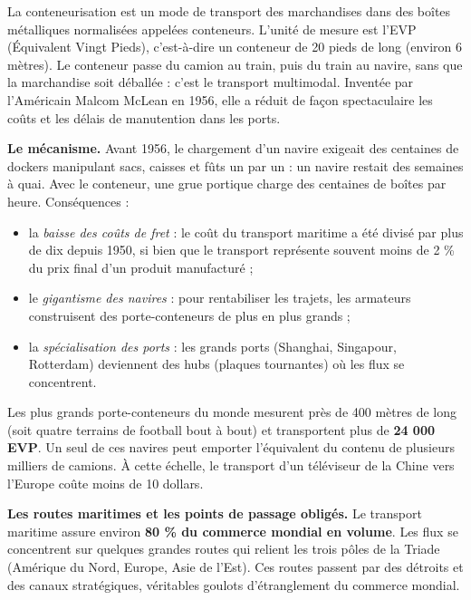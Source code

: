 \documentclass[11pt]{article}
\newcommand{\cle}[1]{{\popxbold\color{popdark}#1}}
\begin{document}
\begin{definition}[La conteneurisation]
La \cle{conteneurisation} est un mode de transport des marchandises dans des boîtes métalliques normalisées appelées \cle{conteneurs}. L'unité de mesure est l'\cle{EVP} (Équivalent Vingt Pieds), c'est-à-dire un conteneur de 20 pieds de long (environ 6 mètres). Le conteneur passe du camion au train, puis du train au navire, sans que la marchandise soit déballée : c'est le \cle{transport multimodal}. Inventée par l'Américain Malcom McLean en 1956, elle a réduit de façon spectaculaire les coûts et les délais de manutention dans les ports.
\end{definition}

\textbf{Le mécanisme.} Avant 1956, le chargement d'un navire exigeait des centaines de dockers manipulant sacs, caisses et fûts un par un : un navire restait des semaines à quai. Avec le conteneur, une grue portique charge des centaines de boîtes par heure. Conséquences :

\begin{itemize}
\item la \emph{baisse des coûts de fret} : le coût du transport maritime a été divisé par plus de dix depuis 1950, si bien que le transport représente souvent moins de 2 \% du prix final d'un produit manufacturé ;
\item le \emph{gigantisme des navires} : pour rentabiliser les trajets, les armateurs construisent des porte-conteneurs de plus en plus grands ;
\item la \emph{spécialisation des ports} : les grands ports (Shanghai, Singapour, Rotterdam) deviennent des \cle{hubs} (plaques tournantes) où les flux se concentrent.
\end{itemize}

\begin{exemplebox}
Les plus grands porte-conteneurs du monde mesurent près de 400 mètres de long (soit quatre terrains de football bout à bout) et transportent plus de \textbf{24 000 EVP}. Un seul de ces navires peut emporter l'équivalent du contenu de plusieurs milliers de camions. À cette échelle, le transport d'un téléviseur de la Chine vers l'Europe coûte moins de 10 dollars.
\end{exemplebox}

\textbf{Les routes maritimes et les points de passage obligés.} Le transport maritime assure environ \textbf{80 \% du commerce mondial en volume}. Les flux se concentrent sur quelques grandes routes qui relient les trois pôles de la Triade (Amérique du Nord, Europe, Asie de l'Est). Ces routes passent par des \cle{détroits} et des \cle{canaux} stratégiques, véritables goulots d'étranglement du commerce mondial.
\end{document}
